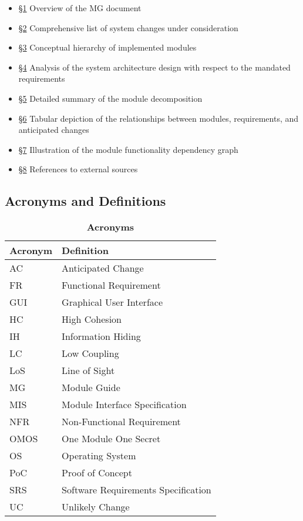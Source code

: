 \documentclass[12pt, titlepage]{article}
\begin{document}
        \begin{itemize}
            \item[] \hyperref[SecIntro]{\S1} Overview of the MG document
            \item[] \hyperref[SecChange]{\S2} Comprehensive list of system changes under consideration
            \item[] \hyperref[SecMH]{\S3} Conceptual hierarchy of implemented modules
            \item[] \hyperref[SecConnection]{\S4} Analysis of the system architecture design with respect to the mandated requirements
            \item[] \hyperref[SecMD]{\S5} Detailed summary of the module decomposition 
            \item[] \hyperref[SecTM]{\S6} Tabular depiction of the relationships between modules, requirements, and anticipated changes
            \item[] \hyperref[SecUse]{\S7} Illustration of the module functionality dependency graph
            \item[] \hyperref[SecRef]{\S8} References to external sources
        \end{itemize}

    \subsection{Acronyms and Definitions}
        \begin{table}[H]
            \centering
            \caption{\bf Acronyms}
            \label{TableAcronym}
            \bigskip
            \def\arraystretch{1.5}
            \begin{tabularx}{\textwidth}{p{3.7cm}X}
                \toprule
                \textbf{Acronym} & \textbf{Definition} \\
                \midrule
                AC & Anticipated Change\\
                FR & Functional Requirement\\
                GUI & Graphical User Interface\\
                HC & High Cohesion\\
                IH & Information Hiding\\
                LC & Low Coupling\\
                LoS & Line of Sight\\
                MG & Module Guide\\
                MIS & Module Interface Specification\\
                NFR & Non-Functional Requirement\\
                OMOS & One Module One Secret\\
                OS & Operating System\\
                PoC & Proof of Concept\\
                SRS & Software Requirements Specification\\
                UC & Unlikely Change\\
            \bottomrule
            \end{tabularx}
        \end{table}
\end{document}
